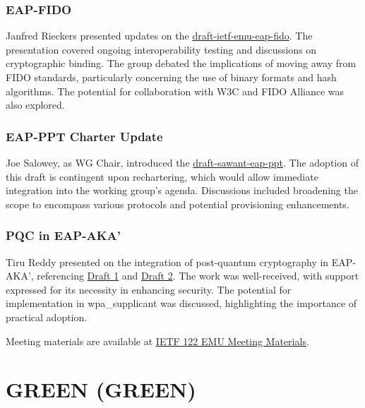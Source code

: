 \documentclass{article}
\begin{document}
\subsubsection{EAP-FIDO}

Janfred Rieckers presented updates on the \href{https://datatracker.ietf.org/doc/html/draft-ietf-emu-eap-fido}{draft-ietf-emu-eap-fido}. The presentation covered ongoing interoperability testing and discussions on cryptographic binding. The group debated the implications of moving away from FIDO standards, particularly concerning the use of binary formats and hash algorithms. The potential for collaboration with W3C and FIDO Alliance was also explored.

\subsubsection{EAP-PPT Charter Update}

Joe Salowey, as WG Chair, introduced the \href{https://datatracker.ietf.org/doc/html/draft-sawant-eap-ppt}{draft-sawant-eap-ppt}. The adoption of this draft is contingent upon rechartering, which would allow immediate integration into the working group's agenda. Discussions included broadening the scope to encompass various protocols and potential provisioning enhancements.

\subsubsection{PQC in EAP-AKA'}

Tiru Reddy presented on the integration of post-quantum cryptography in EAP-AKA', referencing \href{https://datatracker.ietf.org/doc/html/draft-ar-emu-pqc-eapaka}{Draft 1} and \href{https://datatracker.ietf.org/doc/html/draft-ra-emu-pqc-eapaka}{Draft 2}. The work was well-received, with support expressed for its necessity in enhancing security. The potential for implementation in wpa\_supplicant was discussed, highlighting the importance of practical adoption.

Meeting materials are available at \href{https://www.ietf.org/proceedings/122/emu.html}{IETF 122 EMU Meeting Materials}.




\newpage

\section{GREEN (GREEN)}
\end{document}
